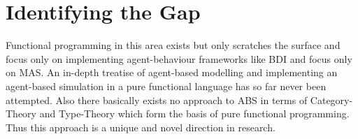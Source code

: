 \section{Identifying the Gap}
Functional programming in this area exists but only scratches the surface and focus only on implementing agent-behaviour frameworks like BDI and focus only on MAS. An in-depth treatise of agent-based modelling and implementing an agent-based simulation in a pure functional language has so far never been attempted. Also there basically exists no approach to ABS in terms of Category-Theory and Type-Theory which form the basis of pure functional programming. Thus this approach is a unique and novel direction in research.
